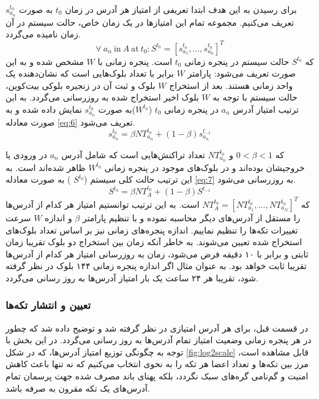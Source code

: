 برای رسیدن به این هدف ابتدا تعریفی از امتیاز هر آدرس در زمان $t_0$ به صورت 
$s_{a_n}^{t_0}$
تعریف می‌کنیم. مجموعه تمام این امتیاز‌ها در یک زمان خاص، حالت سیستم در آن زمان نامیده می‌گردد. 
\begin{equation}
\forall\ a_n\ \text{in}\  A\  \text{at}\  t_0: S^{t_0} = [s_{a_1}^{t_0}, ..., s_{a_n}^{t_0}]^T  
\label{eq:5}
\end{equation}
که
$S^{t_0}$
حالت سیستم در پنجره زمانی $t_0$ است. پنجره زمانی با $W$ مشخص شده و به این صورت تعریف می‌شود: پارامتر $W$ برابر با تعداد بلوک‌هایی است که نشان‌دهنده یک واحد زمانی هستند. بعد از استخراج $W$ بلوک و ثبت آن در زنجیره بلوکی بیت‌کوین، حالت سیستم با توجه به $W$ بلوک اخیر استخراج شده به روزرسانی می‌گردد. به این ترتیب امتیاز آدرس $a_n$ در پنجره زمانی  $t_0$  ($W^{t_0}$)به صورت $s_{a_n}^{t_0}$ نمایش داده شده و به صورت معادله \eqref{eq:6} تعریف می‌شود.
\begin{equation}
s_{a_n}^{t_0} = \beta NT_{a_n}^{t_0} + (1-\beta) s_{a_n}^{t_{-1}}
\label{eq:6}
\end{equation}

که
$0<\beta<1$
و
$NT_{a_n}^{t_0}$
تعداد تراکنش‌هایی است که شامل آدرس $a_n$ در ورودی یا خروجیشان بوده‌اند و در بلوک‌های موجود در پنجره زمانی $W^{t_0}$ ظاهر شده‌اند است. به این ترتیب حالت کلی سیستم ($S^{t_0}$ ) به صورت معادله \eqref{eq:7} به روزرسانی می‌شود.
\begin{equation}
S^{t_0} = \beta NT_{A}^{t_0} + (1-\beta) S^{t_{-1}}
\label{eq:7}
\end{equation}
که 
$NT_{A}^{t_0} = [NT_{a_1}^{t_0}, ..., NT_{a_N}^{t_0}]^T$
است. به این ترتیب توانستیم امتیاز هر کدام از آدرس‌ها را مستقل از آدرس‌های دیگر محاسبه نموده و با تنظیم پارامتر $\beta$ و اندازه $W$ سرعت تغییرات تکه‌ها را تنظیم نماییم. اندازه پنجره‌های زمانی نیز بر اساس تعداد بلوک‌های استخراج شده تعیین می‌شوند. به خاطر آنکه زمان بین استخراج دو بلوک تقریبا زمان ثابتی و برابر با ۱۰ دقیقه فرض می‌شود، زمان به روزرسانی امتیاز هر کدام از آدرس‌ها تقریبا ثابت خواهد بود. به عنوان مثال اگر اندازه پنجره زمانی ۱۴۴ بلوک در نظر گرفته شود، تقریبا هر ۲۴ ساعت یک بار امتیاز آدرس‌ها به روز رسانی می‌گردد.  


\subsubsection{تعیین و انتشار تکه‌ها}
\label{subsubsection:4.3.2}
در قسمت قبل، برای هر آدرس امتیازی در نظر گرفته شد و توضیح داده شد که چطور در هر پنجره زمانی وضعیت امتیاز تمام آدرس‌ها به روز رسانی می‌گردد. در این بخش با توجه به چگونگی توزیع امتیاز آدرس‌ها، که در شکل \ref{fig:log2scale} قابل مشاهده است، مرز بین تکه‌ها و تعداد اعضا هر تکه را به نحوی انتخاب می‌کنیم که نه تنها باعث کاهش امنیت و گم‌نامی گره‌های سبک نگردد، بلکه پهنای باند مصرف شده جهت پرسمان تمام آدرس‌های یک تکه مقرون به صرفه باشد.


